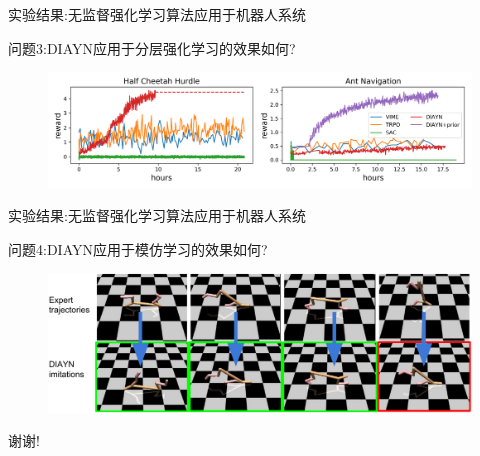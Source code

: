 \documentclass{beamer}
\begin{document}
\begin{frame}{实验结果:无监督强化学习算法应用于机器人系统}
\begin{block}{问题3:DIAYN应用于分层强化学习的效果如何?}
\begin{figure}[htpb]
\begin{center}
    \includegraphics[width=1\linewidth]{pic/hierarchy_rewards.png}
\end{center}
\end{figure}
\end{block}
\end{frame}

\begin{frame}{实验结果:无监督强化学习算法应用于机器人系统}
\begin{block}{问题4:DIAYN应用于模仿学习的效果如何?}
\begin{figure}[htpb]
\begin{center}
    \includegraphics[width=1\linewidth]{pic/cheetah_imitation.pdf}
\end{center}
\end{figure}
\end{block}
\end{frame}

\begin{frame}{}
\begin{center}
    \Huge{谢谢!}
\end{center}
\end{frame}
\end{document}
